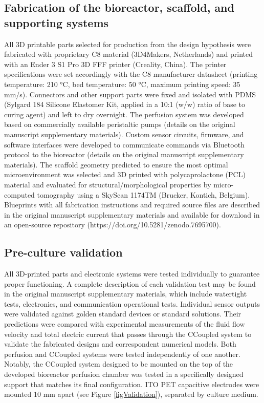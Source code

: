 \subsection{Fabrication of the bioreactor, scaffold, and supporting systems}
All \acs{3D} printable parts selected for production from the design hypothesis were fabricated with proprietary \acs{C8} material (3D4Makers, Netherlands) and printed with an Ender 3 S1 Pro 3D FFF printer (Creality, China). The printer specifications were set accordingly with the \acs{C8} manufacturer datasheet (printing temperature: 210 \si{\celsius}, bed temperature: 50 \si{\celsius}, maximum printing speed: 35 mm/s). Connectors and other support parts were fixed and isolated with PDMS (Sylgard 184 Silicone Elastomer Kit, applied in a 10:1 (w/w) ratio of base to curing agent) and left to dry overnight. The perfusion system was developed based on commercially available peristaltic pumps (details on the original manuscript supplementary materials). Custom sensor circuits, firmware, and software interfaces were developed to communicate commands via Bluetooth protocol to the bioreactor (details on the original manuscript supplementary materials). The scaffold geometry predicted to ensure the most optimal microenvironment was selected and 3D printed with polycaprolactone (PCL) material and evaluated for structural/morphological properties by micro-computed tomography using a SkyScan 1174TM (Brucker, Kontich, Belgium). Blueprints with all fabrication instructions and required source files are described in the original manuscript supplementary materials and available for download in an open-source repository (https://doi.org/10.5281/zenodo.7695700).


\subsection{Pre-culture validation}
All \acs{3D}-printed parts and electronic systems were tested individually to guarantee proper functioning. A complete description of each validation test may be found in the original manuscript supplementary materials, which include watertight tests, electronics, and communication operational tests. Individual sensor outputs were validated against golden standard devices or standard solutions. Their predictions were compared with experimental measurements of the fluid flow velocity and total electric current that passes through the \acs{CCoupled} system to validate the fabricated designs and correspondent numerical models. Both perfusion and \acs{CCoupled} systems were tested independently of one another. Notably, the \acs{CCoupled} system designed to be mounted on the top of the developed bioreactor perfusion chamber was tested in a specifically designed support that matches its final configuration. ITO PET capacitive electrodes were mounted 10 \si{\milli\meter} apart (see Figure \ref{figValidation}), separated by culture medium.


